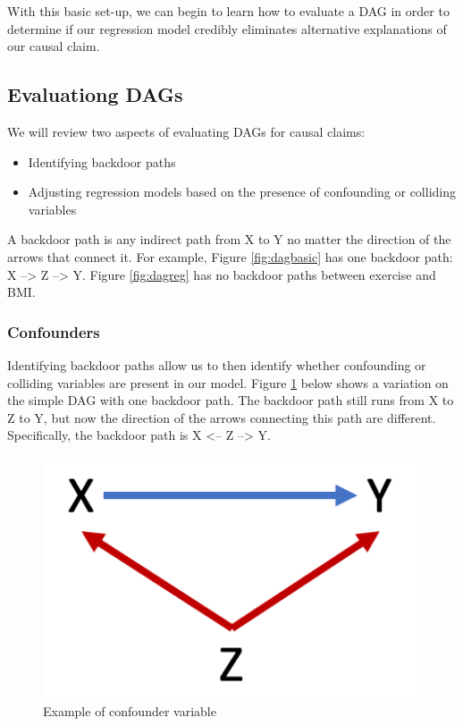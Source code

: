 \documentclass[
]{book}
\providecommand{\tightlist}{%
  \setlength{\itemsep}{0pt}\setlength{\parskip}{0pt}}
\begin{document}
With this basic set-up, we can begin to learn how to evaluate a DAG in order to determine if our regression model credibly eliminates alternative explanations of our causal claim.

\hypertarget{evaluationg-dags}{%
\subsection{Evaluationg DAGs}\label{evaluationg-dags}}

We will review two aspects of evaluating DAGs for causal claims:

\begin{itemize}
\tightlist
\item
  Identifying backdoor paths
\item
  Adjusting regression models based on the presence of confounding or colliding variables
\end{itemize}

A backdoor path is any indirect path from X to Y no matter the direction of the arrows that connect it. For example, Figure \ref{fig:dagbasic} has one backdoor path: X --\textgreater{} Z --\textgreater{} Y. Figure \ref{fig:dagreg} has no backdoor paths between exercise and BMI.

\hypertarget{confounders}{%
\subsubsection*{Confounders}\label{confounders}}

Identifying backdoor paths allow us to then identify whether confounding or colliding variables are present in our model. Figure \ref{fig:dagconf} below shows a variation on the simple DAG with one backdoor path. The backdoor path still runs from X to Z to Y, but now the direction of the arrows connecting this path are different. Specifically, the backdoor path is X \textless-- Z --\textgreater{} Y.

\begin{figure}
\includegraphics[width=5.74in]{images/dag_confound} \caption{Example of confounder variable}\label{fig:dagconf}
\end{figure}
\end{document}
